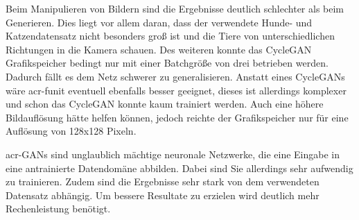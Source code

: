 Beim Manipulieren von Bildern sind die Ergebnisse deutlich schlechter als beim Generieren. 
Dies liegt vor allem daran, dass der verwendete Hunde- und Katzendatensatz nicht 
besonders groß ist und die Tiere von unterschiedlichen Richtungen in die Kamera schauen. 
Des weiteren konnte das CycleGAN Grafikspeicher bedingt nur mit einer Batchgröße von drei 
betrieben werden. Dadurch fällt es dem Netz schwerer zu generalisieren. Anstatt eines 
CycleGANs wäre \gls{acr-funit} eventuell ebenfalls besser geeignet, dieses ist allerdings 
komplexer und schon das CycleGAN konnte kaum trainiert werden. Auch eine höhere 
Bildauflösung hätte helfen können, jedoch reichte der Grafikspeicher nur für eine 
Auflösung von 128x128 Pixeln.

\gls{acr-GAN}s sind unglaublich mächtige neuronale Netzwerke, die eine Eingabe in eine 
antrainierte Datendomäne abbilden. Dabei sind Sie allerdings sehr aufwendig zu trainieren. 
Zudem sind die Ergebnisse sehr stark von dem verwendeten Datensatz abhängig. Um 
bessere Resultate zu erzielen wird deutlich mehr Rechenleistung benötigt.





